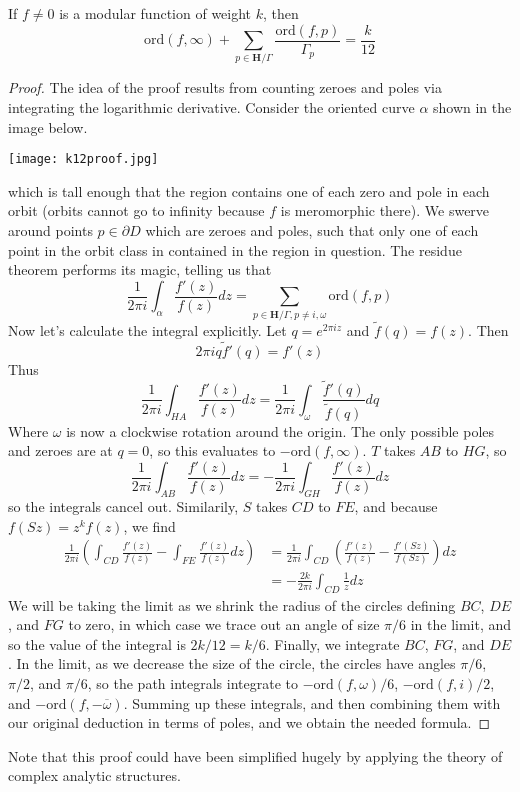 \begin{theorem}
    If $f \neq 0$ is a modular function of weight $k$, then
    \[ \text{ord}(f,\infty) + \sum_{p \in \mathbf{H}/\Gamma} \frac{\text{ord}(f,p)}{\Gamma_p} = \frac{k}{12} \]
\end{theorem}
\begin{proof}
    The idea of the proof results from counting zeroes and poles via integrating the logarithmic derivative. Consider the oriented curve $\alpha$ shown in the image below.
    \begin{center}
    \texttt{[image: k12proof.jpg]}
    \end{center}
    which is tall enough that the region contains one of each zero and pole in each orbit (orbits cannot go to infinity because $f$ is meromorphic there). We swerve around points $p \in \partial D$ which are zeroes and poles, such that only one of each point in the orbit class in contained in the region in question. The residue theorem performs its magic, telling us that
    \[ \frac{1}{2\pi i} \int_\alpha \frac{f'(z)}{f(z)} dz = \sum_{p \in \mathbf{H}/\Gamma, p \neq i, \omega} \text{ord}(f,p) \]
    Now let's calculate the integral explicitly. Let $q = e^{2 \pi i z}$ and $\tilde{f}(q) = f(z)$. Then
    \[ 2 \pi i q \tilde{f}'(q) = f'(z)  \]
    Thus
    \[ \frac{1}{2 \pi i} \int_{HA} \frac{f'(z)}{f(z)} dz = \frac{1}{2 \pi i} \int_{\omega} \frac{\tilde{f}'(q)}{\tilde{f}(q)} dq \]
    Where $\omega$ is now a clockwise rotation around the origin. The only possible poles and zeroes are at $q = 0$, so this evaluates to $- \text{ord}(f,\infty)$. $T$ takes $AB$ to $HG$, so
    \[ \frac{1}{2 \pi i} \int_{AB} \frac{f'(z)}{f(z)} dz = - \frac{1}{2 \pi i} \int_{GH} \frac{f'(z)}{f(z)} dz \]
    so the integrals cancel out. Similarily, $S$ takes $CD$ to $FE$, and because $f(Sz) = z^k f(z)$, we find
    \begin{align*}
        \frac{1}{2 \pi i} \left( \int_{CD} \frac{f'(z)}{f(z)} - \int_{FE} \frac{f'(z)}{f(z)} dz \right) &= \frac{1}{2 \pi i} \int_{CD} \left( \frac{f'(z)}{f(z)} - \frac{f'(Sz)}{f(Sz)} \right) dz\\
        &= -\frac{2k}{2 \pi i} \int_{CD} \frac{1}{z} dz
    \end{align*}
    We will be taking the limit as we shrink the radius of the circles defining $BC$, $DE$, and $FG$ to zero, in which case we trace out an angle of size $\pi/6$ in the limit, and so the value of the integral is $2k/12 = k/6$. Finally, we integrate $BC$, $FG$, and $DE$. In the limit, as we decrease the size of the circle, the circles have angles $\pi/6$, $\pi/2$, and $\pi/6$, so the path integrals integrate to $- \text{ord}(f,\omega)/6$, $- \text{ord}(f,i)/2$, and $- \text{ord}(f, -\overline{\omega})$. Summing up these integrals, and then combining them with our original deduction in terms of poles, and we obtain the needed formula.
\end{proof}

Note that this proof could have been simplified hugely by applying the theory of complex analytic structures.

